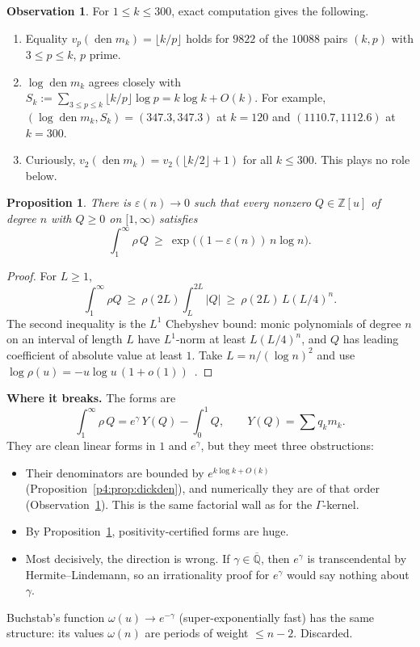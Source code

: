 \documentclass[11pt,a4paper]{article}
\newtheorem{proposition}[theorem]{Proposition}
\theoremstyle{definition}
\newtheorem{observation}[theorem]{Observation}
\theoremstyle{remark}
\newcommand{\Z}{\mathbb Z}
\newcommand{\Qbar}{\overline{\mathbb Q}}
\DeclareMathOperator{\den}{den}
\numberwithin{equation}{section}
\begin{document}
\begin{observation}\label{p4:obs:dick}
For $1\le k\le300$, exact computation gives the following.
\begin{enumerate}[label=(\alph*),leftmargin=2em]
\item Equality $v_p(\den m_k)=\lfloor k/p\rfloor$ holds for $9822$ of the $10088$ pairs $(k,p)$ with $3\le p\le k$, $p$ prime.
\item $\log\den m_k$ agrees closely with $S_k:=\sum_{3\le p\le k}\lfloor k/p\rfloor\log p=k\log k+O(k)$. For example, $(\log\den m_k,S_k)=(347.3,347.3)$ at $k=120$ and $(1110.7,1112.6)$ at $k=300$.
\item Curiously, $v_2(\den m_k)=v_2(\lfloor k/2\rfloor+1)$ for all $k\le300$. This plays no role below.
\end{enumerate}
\end{observation}

\begin{proposition}\label{p4:prop:dickpos}
There is $\varepsilon(n)\to0$ such that every nonzero $Q\in\Z[u]$ of degree $n$ with $Q\ge0$ on $[1,\infty)$ satisfies
\[
\int_1^\infty\rho\,Q\ \ge\ \exp\bigl((1-\varepsilon(n))\,n\log n\bigr).
\]
\end{proposition}

\begin{proof}
For $L\ge1$,
\[
\int_1^\infty\rho Q\ \ge\ \rho(2L)\int_L^{2L}|Q|\ \ge\ \rho(2L)\,L(L/4)^n .
\]
The second inequality is the $L^1$ Chebyshev bound: monic polynomials of degree $n$ on an interval of length $L$ have $L^1$-norm at least $L(L/4)^n$, and $Q$ has leading coefficient of absolute value at least $1$. Take $L=n/(\log n)^2$ and use $\log\rho(u)=-u\log u\,(1+o(1))$~\cite{p4:dB}.
\end{proof}

\noindent\textbf{Where it breaks.} The forms are
\[
\int_1^\infty\rho\,Q=e^\gamma\,Y(Q)-\int_0^1Q,\qquad Y(Q)=\sum q_km_k .
\]
They are clean linear forms in $1$ and $e^\gamma$, but they meet three obstructions:
\begin{itemize}[leftmargin=2em]
\item Their denominators are bounded by $e^{k\log k+O(k)}$ (Proposition~\ref{p4:prop:dickden}), and numerically they are of that order (Observation~\ref{p4:obs:dick}). This is the same factorial wall as for the $\Gamma$-kernel.
\item By Proposition~\ref{p4:prop:dickpos}, positivity-certified forms are huge.
\item Most decisively, the direction is wrong. If $\gamma\in\Qbar$, then $e^\gamma$ is transcendental by Hermite--Lindemann, so an irrationality proof for $e^\gamma$ would say nothing about $\gamma$.
\end{itemize}
Buchstab's function $\omega(u)\to e^{-\gamma}$ (super-exponentially fast) has the same structure: its values $\omega(n)$ are periods of weight $\le n-2$. Discarded.
\end{document}
